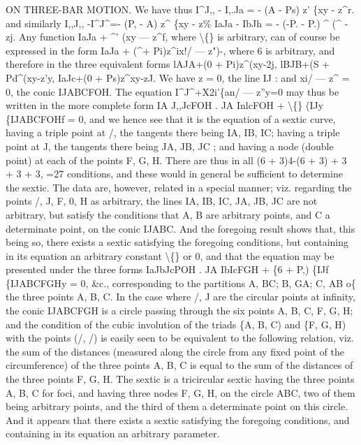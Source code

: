 \documentclass[12pt,a4paper]{article}
\begin{document}
ON THREE-BAR MOTION.
We have thus
I\textasciicircum{}J,, - I,.Ja = - (A - Ps) z' \{xy - z\textasciicircum{}r.
and
similarly
I,,J,, -I\textasciicircum{}J\textasciicircum{}=- (P, - A) z\textasciicircum{} \{xy - z\%
IaJa - IbJh = - (-P. - P.) \textasciicircum{} (\textasciicircum{} - zj.
Any function IaJa + \textasciicircum{}' (xy --- z\textasciicircum{}f, where \textbackslash\{\}
is
arbitrary, can
of
course
be expressed
in
the
form
IaJa + (\textasciicircum{}+ Pi)z\textasciicircum{}ix!/ --- z")-,
where
6
is
arbitrary,
and
therefore
in
the
three equivalent forms
lAJA+(0 + Pi)z\textasciicircum{}(xy-2j,
lBJB+(S + Pd\textasciicircum{}(xy-z'y,
IaJc+(0 + Ps)z\textasciicircum{}xy-zJ.
We have z = 0, the
line IJ
:
and
xi/ --- z\textasciicircum{} = 0, the conic IJABCFOH.
The
equation
I\textasciicircum{}J\textasciicircum{}+X2i'\{an/ --- z''y=0 may thus be written
in the more complete form
IA J,,JcFOH . JA InlcFOH + \textbackslash\{\} (IJy \{IJABCFOHf = 0,
and we
hence
see
that
it
is
the
equation
of
a
sextic
curve,
having
a
triple
point
at
/,
the
tangents
there
being IA, IB, IC;
having
a
triple
point
at J, the
tangents
there
being JA,
JB, JC
;
and
having
a
node
(double
point)
at
each
of
the
points
F,
G, H.
There
are
thus
in
all
(6 + 3)4-(6 + 3) + 3 + 3 + 3, =27
conditions, and
these
would
in
general
be
sufficient
to
determine
the
sextic.
The
data
are,
however,
related
in
a
special
manner;
viz.
regarding
the
points
/,
J,
F,
0, H
as
arbitrary,
the
lines IA,
IB,
IC, JA, JB, JC
are
not
arbitrary,
but
satisfy
the
conditions
that
A, B
are
arbitrary
points,
and C
a
determinate
point,
on
the
conic IJABC.
And
the
foregoing
result
shows
that,
this
being
so,
there
exists
a
sextic
satisfying
the
foregoing
conditions,
but
containing
in
its
equation
an
arbitrary
constant \textbackslash\{\}
or
0, and
that the equation may be presented under the three forms
IaJbJcPOH
. JA IbIcFGH + \{6 + P,) \{IJf \{IJABCFGHy = 0,
\&c.,
corresponding
to the partitions A, BC;
B, GA;
C, AB o\{ the three points A, B,
C.
In
the
case
where
/, J
are
the
circular
points
at
infinity,
the conic IJABCFGH
is
a
circle
passing
through
the
six
points
A,
B,
C,
F,
G, H;
and
the
condition
of
the
cubic
involution
of
the
triads \{A, B, C)
and
\{F,
G, H) with
the
points
(/, /)
is
easily
seen
to
be
equivalent
to
the
following
relation,
viz.
the
sum
of
the
distances
(measured
along
the
circle
from
any
fixed
point
of
the
circumference)
of
the
three
points
A,
B, C
is
equal
to
the sum
of
the
distances
of
the
three
points
F,
G, H.
The
sextic
is
a
tricircular
sextic
having
the
three
points
A,
B, C
for
foci,
and
having
three
nodes
F,
G, H,
on
the
circle ABC,
two
of them
being
arbitrary
points,
and
the
third
of them
a determinate
point
on
this
circle.
And
it
appears
that
there
exists
a
sextic
satisfying
the
foregoing
conditions,
and
containing
in
its
equation
an
arbitrary parameter.
\end{document}
